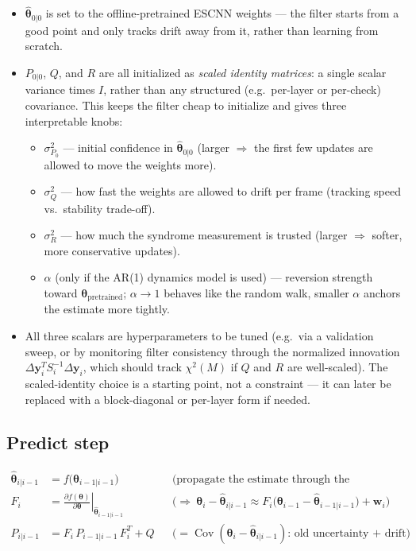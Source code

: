 \documentclass{article}
\newcommand{\state}{\boldsymbol{\theta}}
\begin{document}
\begin{itemize}[itemsep=2pt]
  \item $\hat{\state}_{0|0}$ is set to the offline-pretrained ESCNN weights — the filter starts
  from a good point and only tracks drift away from it, rather than learning from scratch.
  \item $P_{0|0}$, $Q$, and $R$ are all initialized as \emph{scaled identity matrices}: a single
  scalar variance times $I$, rather than any structured (e.g.\ per-layer or per-check)
  covariance. This keeps the filter cheap to initialize and gives three interpretable knobs:
  \begin{itemize}
    \item $\sigma_{P_0}^2$ — initial confidence in $\hat{\state}_{0|0}$ (larger $\Rightarrow$
    the first few updates are allowed to move the weights more).
    \item $\sigma_Q^2$ — how fast the weights are allowed to drift per frame (tracking speed
    vs.\ stability trade-off).
    \item $\sigma_R^2$ — how much the syndrome measurement is trusted (larger $\Rightarrow$
    softer, more conservative updates).
    \item $\alpha$ (only if the AR(1) dynamics model is used) — reversion strength toward
    $\state_{\text{pretrained}}$; $\alpha \to 1$ behaves like the random walk, smaller $\alpha$
    anchors the estimate more tightly.
  \end{itemize}
  \item All three scalars are hyperparameters to be tuned (e.g.\ via a validation sweep, or by
  monitoring filter consistency through the normalized innovation
  $\Delta\mathbf{y}_i^T S_i^{-1} \Delta\mathbf{y}_i$, which should track $\chi^2(M)$ if $Q$ and
  $R$ are well-scaled). The scaled-identity choice is a starting point, not a constraint — it
  can later be replaced with a block-diagonal or per-layer form if needed.
\end{itemize}

\subsection{Predict step}
\label{sec:predict}

\begin{align}
\hat{\state}_{i|i-1} &= f\big(\hat{\state}_{i-1|i-1}\big) \label{eq:pred-mean}
  && \text{(propagate the estimate through the dynamics)} \\
F_i &= \left.\frac{\partial f(\state)}{\partial \state}\right|_{\hat{\state}_{i-1|i-1}} \label{eq:pred-F}
  && \Big(\Rightarrow\ \state_i-\hat{\state}_{i|i-1} \approx F_i\big(\state_{i-1}-\hat{\state}_{i-1|i-1}\big)+\mathbf{w}_i\Big) \\
P_{i|i-1} &= F_i \, P_{i-1|i-1} \, F_i^T + Q \label{eq:pred-P}
  && \big(= \operatorname{Cov}(\state_i-\hat{\state}_{i|i-1})\text{: old uncertainty + drift}\big)
\end{align}
\end{document}
